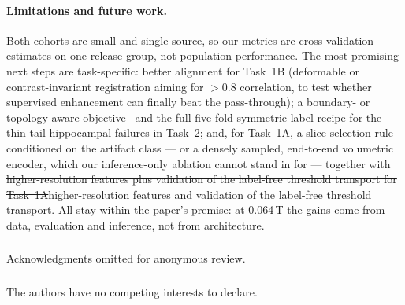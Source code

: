 \documentclass[runningheads]{llncs}
\newcommand{\addboth}[1]{\textcolor{revboth}{#1}}
\newcommand{\delboth}[1]{\textcolor{revboth}{\sout{#1}}}
\begin{document}
\paragraph{Limitations and future work.}
Both cohorts are small and single-source, so our metrics are cross-validation
estimates on one release group, not population performance. The most promising
next steps are task-specific: better alignment for Task~1B (deformable or
contrast-invariant registration aiming for $>0.8$ correlation, to test whether
supervised enhancement can finally beat the pass-through); a boundary- or
topology-aware objective~\cite{kervadec2021boundary} and the full five-fold
symmetric-label recipe for the thin-tail hippocampal failures in Task~2;
and\addboth{, for Task~1A, a slice-selection rule conditioned on the artifact class ---
or a densely sampled, end-to-end volumetric encoder, which our inference-only ablation
cannot stand in for --- together with} \delboth{higher-resolution features plus
validation of the label-free threshold transport for Task~1A}\addboth{higher-resolution
features and validation of the label-free threshold transport}. All stay within the paper's premise: at 0.064\,T the gains come from
data, evaluation and inference, not from architecture.

\begin{credits}
\subsubsection{\ackname}
Acknowledgments omitted for anonymous review.
\subsubsection{\discintname}
The authors have no competing interests to declare.
\end{credits}
\end{document}
